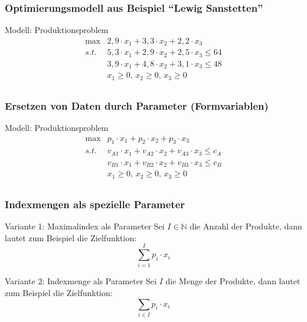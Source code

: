 \begin{frame}
 \frametitle{Optimierungsmodell aus Beispiel ``Lewig Sanstetten''}
 \begin{block}{Modell: Produktionsproblem}
 \Large
 \begin{equation*}
  \begin{array}{ll}
    \max & 2,9\cdot x_1 + 3,3\cdot x_2 + 2,2\cdot x_3\\
    s.t. & 5,3\cdot x_1 + 2,9\cdot x_2 + 2,5\cdot x_3 \leq 64\\
	  & 3,9\cdot x_1 + 4,8\cdot x_2 + 3,1\cdot x_3 \leq 48\\
	  & x_1\geq0,\,x_2\geq0,\,x_3\geq0\\
  \end{array}
 \end{equation*}
 \end{block}
\end{frame}

\begin{frame}
 \frametitle{Ersetzen von Daten durch Parameter (Formvariablen)}
 \begin{block}{Modell: Produktionsproblem}
 \Large
 \begin{equation*}
  \begin{array}{ll}
  \max & p_1\cdot x_1 + p_2\cdot x_2 + p_3\cdot x_3\\
  s.t. & v_{A1}\cdot x_1 + v_{A2}\cdot x_2 + v_{A3}\cdot x_3 \leq c_A\\
	& v_{B1}\cdot x_1 + v_{B2}\cdot x_2 + v_{B3}\cdot x_3 \leq c_B\\
	& x_1\geq0,\,x_2\geq0,\,x_3\geq0\\
  \end{array}
 \end{equation*}
 \end{block}
\end{frame}

\begin{frame}
 \frametitle{Indexmengen als spezielle Parameter}
 \begin{block}{Variante 1: Maximalindex als Parameter}
  Sei $I\in\mathbb{N}$ die Anzahl der Produkte, dann lautet zum Beispiel die Zielfunktion:
  \[
   \sum_{i=1}^I p_i \cdot x_i
  \]
 \end{block}
 \begin{block}{Variante 2: Indexmenge als Parameter}
  Sei $I$ die Menge der Produkte, dann lautet zum Beispiel die Zielfunktion:
  \[
   \sum_{i\in I} p_i\cdot x_i
  \]
 \end{block}
\end{frame}

